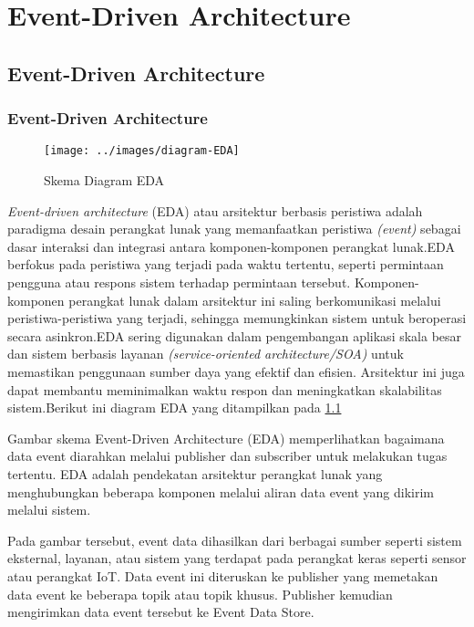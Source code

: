 \chapter{Event-Driven Architecture}


\section{Event-Driven Architecture}
\subsection{Event-Driven Architecture}
\begin{figure}[h]
	\centering
	\texttt{[image: ../images/diagram-EDA]}
	\caption{Skema Diagram EDA}
	\label{fig:diagram-EDA}
\end{figure}
\textit{Event-driven architecture} (EDA) atau arsitektur berbasis peristiwa adalah paradigma desain perangkat lunak yang memanfaatkan peristiwa \textit{(event)} sebagai dasar interaksi dan integrasi antara komponen-komponen perangkat lunak.EDA berfokus pada peristiwa yang terjadi pada waktu tertentu, seperti permintaan pengguna atau respons sistem terhadap permintaan tersebut. Komponen-komponen perangkat lunak dalam arsitektur ini saling berkomunikasi melalui peristiwa-peristiwa yang terjadi, sehingga memungkinkan sistem untuk beroperasi secara asinkron.EDA sering digunakan dalam pengembangan aplikasi skala besar dan sistem berbasis layanan \textit{ (service-oriented architecture/SOA)} untuk memastikan penggunaan sumber daya yang efektif dan efisien. Arsitektur ini juga dapat membantu meminimalkan waktu respon dan meningkatkan skalabilitas sistem.Berikut ini diagram EDA yang ditampilkan pada \ref{fig:diagram-EDA}

Gambar skema Event-Driven Architecture (EDA) memperlihatkan bagaimana data event diarahkan melalui publisher dan subscriber untuk melakukan tugas tertentu. EDA adalah pendekatan arsitektur perangkat lunak yang menghubungkan beberapa komponen melalui aliran data event yang dikirim melalui sistem.

Pada gambar tersebut, event data dihasilkan dari berbagai sumber seperti sistem eksternal, layanan, atau sistem yang terdapat pada perangkat keras seperti sensor atau perangkat IoT. Data event ini diteruskan ke publisher yang memetakan data event ke beberapa topik atau topik khusus. Publisher kemudian mengirimkan data event tersebut ke Event Data Store.

